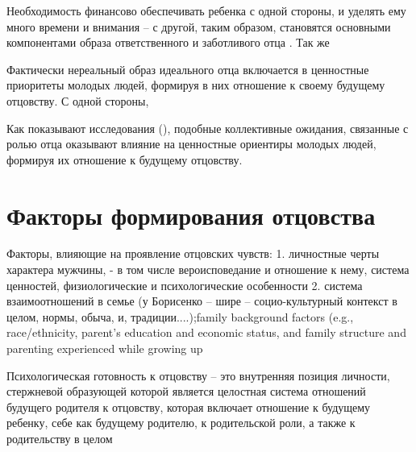 \documentclass{../../common/thesisbyxetex}
\begin{document}
Необходимость финансово обеспечивать ребенка с одной стороны, и уделять ему много времени и
внимания -- с другой, таким образом, становятся основными компонентами образа ответственного и
заботливого отца \cite[129]{f21}. Так же




Фактически нереальный образ идеального отца включается в ценностные приоритеты молодых людей,
формируя в них отношение к своему будущему отцовству. С одной стороны,

Как показывают исследования (\cite{imaf}), подобные коллективные ожидания, связанные с ролью отца
оказывают влияние на ценностные ориентиры молодых людей, формируя их отношение к будущему
отцовству.




\section{Факторы формирования отцовства}


Факторы, влияющие на проявление отцовских чувств:
1. личностные черты характера мужчины,
- в том числе вероисповедание и отношение к нему, система ценностей, физиологические и
психологические особенности
2. система взаимоотношений в семье (у Борисенко – шире – социо-культурный контекст в целом, нормы,
обыча, и, традиции....)\cite{psyot};family background factors (e.g.,
race/ethnicity, parent’s education and economic status, and
family structure and parenting experienced while growing up \cite[164]{long}


Психологическая готовность к отцовству – это внутренняя позиция личности,
стержневой образующей которой является целостная система отношений будущего
родителя к отцовству, которая включает отношение к будущему ребенку, себе как
будущему родителю, к родительской роли, а также к родительству в целом \cite[121]{har}
\end{document}
